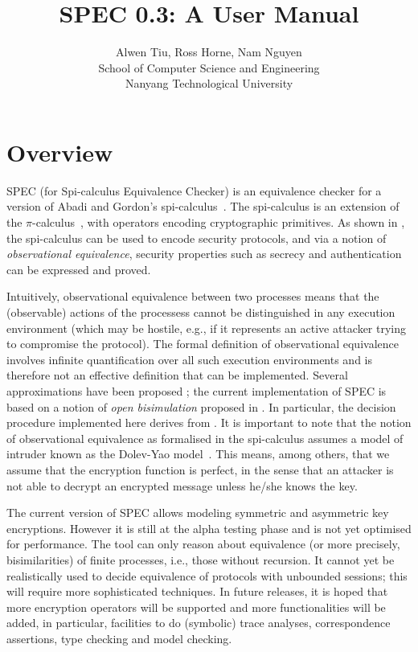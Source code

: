 \documentclass{article}
\title{SPEC 0.3: A User Manual}
\author{Alwen Tiu, Ross Horne, Nam Nguyen \\ 
School of Computer Science and Engineering \\
Nanyang Technological University
}
\date{}
\begin{document}
\maketitle

\section{Overview}
\label{sec:overview}

SPEC (for Spi-calculus Equivalence Checker) is an equivalence checker for 
a version of Abadi and Gordon's spi-calculus~\cite{abadi99ic}. 
The spi-calculus is an extension of the $\pi$-calculus~\cite{milner92icII}, with
operators encoding cryptographic primitives.
As shown in \cite{abadi99ic}, the spi-calculus can be
used to encode security protocols, and via a notion of {\em observational equivalence},
security properties such as secrecy and authentication can be expressed and proved. 

Intuitively, observational equivalence between two processes means that the (observable)
actions of the processess cannot be distinguished in any execution environment (which 
may be hostile, e.g., if it represents an active attacker trying to compromise the
protocol). The formal definition of observational equivalence ~\cite{abadi99ic} involves
infinite quantification over all such execution environments and is therefore 
not an effective definition that can be implemented. Several approximations have been
proposed \cite{abadi98njc,boreale02sjc,borgstrom04concur,borgstrom05mscs,tiu07aplas,tiu09corr};
the current implementation of SPEC is based on a notion of {\em open bisimulation}
proposed in \cite{tiu07aplas,tiu09corr}. In particular, the decision procedure implemented here derives from
\cite{tiu10csf}. It is important to note that the notion of observational equivalence as
formalised in the spi-calculus assumes a model of intruder known as the Dolev-Yao model~\cite{dolev83tit}.
This means, among others, that we assume that the encryption function is perfect, in the sense that
an attacker is not able to decrypt an encrypted message unless he/she knows the key. 

The current version of SPEC allows modeling symmetric and asymmetric key encryptions. However it
is still at the alpha testing phase and is not yet optimised for 
performance. The tool can only reason about equivalence (or more precisely,
bisimilarities) of finite processes, i.e., those without recursion. It cannot yet be realistically
used to decide equivalence of protocols with unbounded sessions; this will require
more sophisticated techniques.  
In future releases, it is hoped that more encryption operators will be supported
and more functionalities will be
added, in particular, facilities to do (symbolic) trace analyses, correspondence assertions,
type checking and model checking. 
\end{document}

